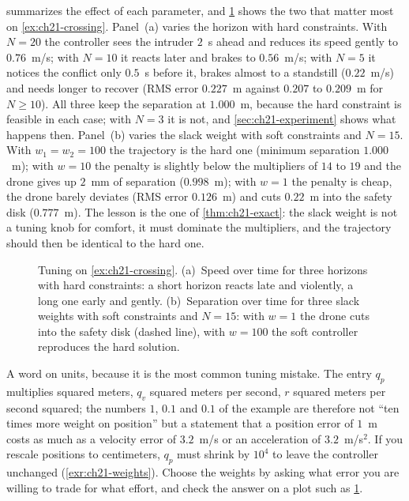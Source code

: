  summarizes the effect of each parameter, and
\cref{fig:ch21-tuning} shows the two that matter most on
\cref{ex:ch21-crossing}. Panel~(a) varies the horizon with hard constraints.
With $N=20$ the controller sees the intruder $2$~s ahead and reduces its
speed gently to $0.76$~m/s; with $N=10$ it reacts later and brakes to
$0.56$~m/s; with $N=5$ it notices the conflict only $0.5$~s before it, brakes
almost to a standstill ($0.22$~m/s) and needs longer to recover (RMS error
$0.227$~m against $0.207$ to $0.209$~m for $N\ge10$). All three keep the separation at
$1.000$~m, because the hard constraint is feasible in each case; with $N=3$
it is not, and \cref{sec:ch21-experiment} shows what happens then.
Panel~(b) varies the slack weight with soft constraints and $N=15$. With
$w_1=w_2=100$ the trajectory is the hard one (minimum separation $1.000$~m);
with $w=10$ the penalty is slightly below the multipliers of $14$ to $19$ and
the drone gives up $2$~mm of separation ($0.998$~m); with $w=1$ the penalty is
cheap, the drone barely deviates (RMS error $0.126$~m) and cuts $0.22$~m into
the safety disk ($0.777$~m). The lesson is the one of
\cref{thm:ch21-exact}: the slack weight is not a tuning knob for comfort, it
must dominate the multipliers, and the trajectory should then be identical to
the hard one.

\begin{figure}[tb]
  \centering
  \caption{Tuning on \cref{ex:ch21-crossing}. (a)~Speed over time for three
  horizons with hard constraints: a short horizon reacts late and violently, a
  long one early and gently. (b)~Separation over time for three slack weights
  with soft constraints and $N=15$: with $w=1$ the drone cuts into the safety
  disk (dashed line), with $w=100$ the soft controller reproduces the hard
  solution.}
  \label{fig:ch21-tuning}
\end{figure}

A word on units, because it is the most common tuning mistake. The entry
$q_p$ multiplies squared meters, $q_v$ squared meters per second, $r$ squared
meters per second squared; the numbers $1$, $0.1$ and $0.1$ of the example are
therefore not ``ten times more weight on position'' but a statement that a
position error of $1$~m costs as much as a velocity error of $3.2$~m/s or an
acceleration of $3.2$~m/s$^2$. If you rescale positions to centimeters, $q_p$
must shrink by $10^4$ to leave the controller unchanged
(\cref{exr:ch21-weights}). Choose the weights by asking what error you are
willing to trade for what effort, and check the answer on a plot such as
\cref{fig:ch21-tuning}.

